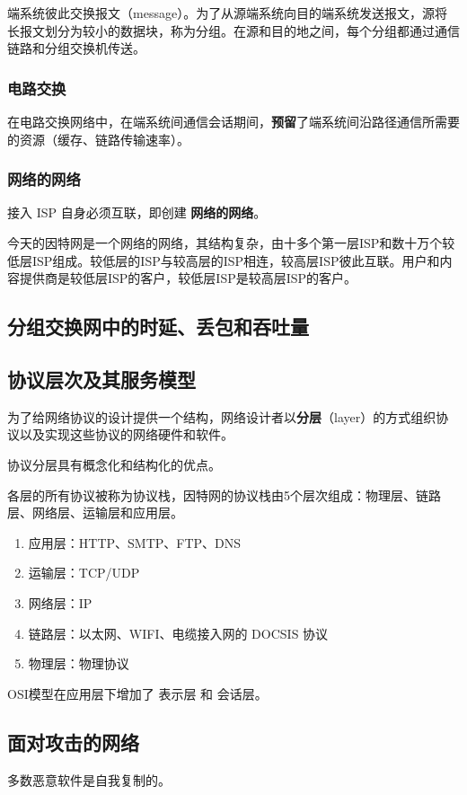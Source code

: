 端系统彼此交换报文（message）。为了从源端系统向目的端系统发送报文，源将长报文划分为较小的数据块，称为分组。在源和目的地之间，每个分组都通过通信链路和分组交换机传送。

\subsubsection{电路交换}

在电路交换网络中，在端系统间通信会话期间，\textbf{预留}了端系统间沿路径通信所需要的资源（缓存、链路传输速率）。

\subsubsection{网络的网络}

接入 ISP 自身必须互联，即创建 \textbf{网络的网络}。

今天的因特网是一个网络的网络，其结构复杂，由十多个第一层ISP和数十万个较低层ISP组成。较低层的ISP与较高层的ISP相连，较高层ISP彼此互联。用户和内容提供商是较低层ISP的客户，较低层ISP是较高层ISP的客户。

\subsection{分组交换网中的时延、丢包和吞吐量}

\subsection{协议层次及其服务模型}

为了给网络协议的设计提供一个结构，网络设计者以\textbf{分层}（layer）的方式组织协议以及实现这些协议的网络硬件和软件。

协议分层具有概念化和结构化的优点。

各层的所有协议被称为协议栈，因特网的协议栈由5个层次组成：物理层、链路层、网络层、运输层和应用层。

\begin{enumerate}
  \item 应用层：HTTP、SMTP、FTP、DNS
  \item 运输层：TCP/UDP
  \item 网络层：IP
  \item 链路层：以太网、WIFI、电缆接入网的 DOCSIS 协议
  \item 物理层：物理协议
\end{enumerate}

OSI模型在应用层下增加了 表示层 和 会话层。

\subsection{面对攻击的网络}

多数恶意软件是自我复制的。



